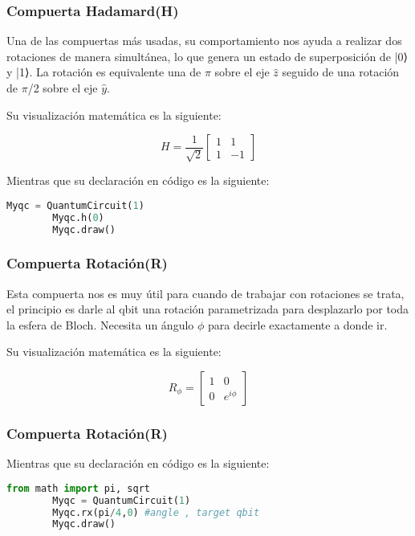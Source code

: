 \documentclass[spanish]{beamer}
\begin{document}
    \newpage\begin{frame}[fragile]
     \frametitle{Compuerta Hadamard(H)} 
     Una de las compuertas más usadas, su comportamiento nos ayuda a realizar dos rotaciones de manera simultánea, lo que genera un estado de superposición de |0⟩ y |1⟩. La rotación es equivalente una de  $\pi$ sobre el eje $\widehat {z}$ seguido de una rotación de  $\pi$/2 sobre el eje $\widehat {y}$.
     
      Su visualización matemática es la siguiente:
     
       \begin{equation}
        H=\frac{1}{\sqrt{2}}\begin{bmatrix}
            1 & 1\\
            1 & -1
        \end{bmatrix}
        \end{equation}
     
     Mientras que su declaración en código es la siguiente:
     
      \begin{lstlisting}[language=Python]
        Myqc = QuantumCircuit(1)
        Myqc.h(0)
        Myqc.draw() \end{lstlisting}
    \end{frame} 
    \newpage
    \begin{frame}[fragile]
    \frametitle{Compuerta Rotación(R)} 
     Esta compuerta nos es muy útil para cuando de trabajar con rotaciones se trata, el principio es darle al qbit una rotación parametrizada para desplazarlo por toda la esfera de Bloch. Necesita un ángulo $\phi$ para decirle exactamente a donde ir.
     
      Su visualización matemática es la siguiente:
     
      \begin{equation}
        R_{\phi}=\begin{bmatrix}
            1 & 0\\
            0 & e^{i\phi}
        \end{bmatrix}
        \end{equation}
    \end{frame}    
     \newpage\begin{frame}[fragile]
     \frametitle{Compuerta Rotación(R)} 
    Mientras que su declaración en código es la siguiente:
     
        \begin{lstlisting}[language=Python]
        from math import pi, sqrt
        Myqc = QuantumCircuit(1)
        Myqc.rx(pi/4,0) #angle , target qbit
        Myqc.draw() \end{lstlisting}
    \end{frame}     
\end{document}
